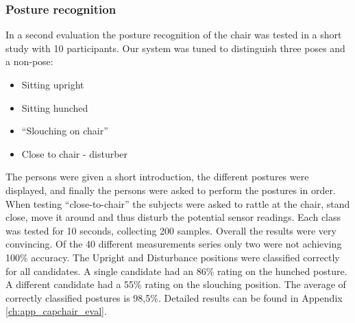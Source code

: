 \subsubsection*{Posture recognition}
In a second evaluation the posture recognition of the chair was tested in a short study with 10 participants. Our system was tuned to distinguish three poses and a non-pose:
\begin{itemize}
\item Sitting upright
\item Sitting hunched
\item “Slouching on chair”
\item Close to chair - disturber
\end{itemize}

The persons were given a short introduction, the different postures were displayed, and finally the persons were asked to perform the postures in order. When testing “close-to-chair” the subjects were asked to rattle at the chair, stand close, move it around and thus disturb the potential sensor readings. Each class was tested for 10 seconds, collecting 200 samples. Overall the results were very convincing. Of the 40 different measurements series only two were not achieving 100\% accuracy. The Upright and Disturbance positions were classified correctly for all candidates. A single candidate had an 86\% rating on the hunched posture. A different candidate had a 55\% rating on the slouching position. The average of correctly classified postures is 98,5\%. Detailed results can be found in Appendix \ref{ch:app_capchair_eval}.


